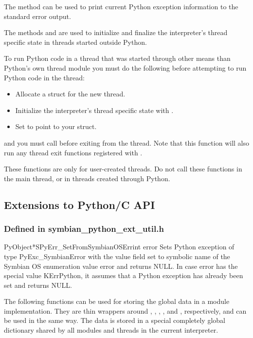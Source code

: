 The  method can be used to print current 
Python exception information to the standard error output.

The methods  and
 are used to initialize
and finalize the interpreter's thread specific state in threads
started outside Python. 

To run Python code in a thread that was started through other means
than Python's own thread module you must do the following before
attempting to run Python code in the thread:
\begin{itemize}
\item Allocate a  struct for the new thread.
\item Initialize the interpreter's thread specific state with .
\item Set  to point to your  struct.
\end{itemize}

and you must call 
before exiting from the thread. Note that this function will also run
any thread exit functions registered with .

These functions are only for user-created threads. Do not call these
functions in the main thread, or in threads created through Python.

\subsection{Extensions to Python/C API}

\subsubsection{Defined in symbian_python_ext_util.h}

\begin{cfuncdesc}{PyObject*}{SPyErr_SetFromSymbianOSErr}{int error}
Sets Python exception of type \textsf{PyExc_SymbianError} with the value 
field set to symbolic name of the Symbian OS enumeration value 
\textsf{error} and returns \textsf{NULL}. In case \textsf{error} has the 
special value \textsf{KErrPython}, it assumes that a Python exception has 
already been set and returns \textsf{NULL}.
\end{cfuncdesc}

The following functions can be used for storing the global data in a module 
implementation. They are thin wrappers around 
,  
, , 
,  and 
, respectively, and can be used in the same way. 
The data is stored in a special completely global dictionary shared by all modules and threads in the current interpreter.

